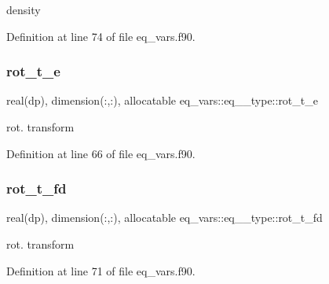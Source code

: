 density 



Definition at line 74 of file eq\+\_\+vars.\+f90.

\mbox{\label{structeq__vars_1_1eq__1__type_a61b6de6cab3634a8eb5037b68349f668}} 
\subsubsection{\texorpdfstring{rot\+\_\+t\+\_\+e}{rot\_t\_e}}
{\footnotesize\ttfamily real(dp), dimension(\+:,\+:), allocatable eq\+\_\+vars\+::eq\+\_\+\_\+type\+::rot\+\_\+t\+\_\+e}



rot. transform 



Definition at line 66 of file eq\+\_\+vars.\+f90.

\mbox{\label{structeq__vars_1_1eq__1__type_ac21c7335fe66b850573b5725d592f955}} 
\subsubsection{\texorpdfstring{rot\+\_\+t\+\_\+fd}{rot\_t\_fd}}
{\footnotesize\ttfamily real(dp), dimension(\+:,\+:), allocatable eq\+\_\+vars\+::eq\+\_\+\_\+type\+::rot\+\_\+t\+\_\+fd}



rot. transform 



Definition at line 71 of file eq\+\_\+vars.\+f90.



